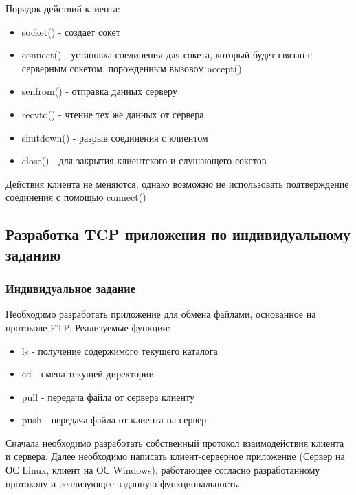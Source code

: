 Порядок действий клиента:
\begin{itemize}
\item socket() - создает сокет
\item connect() - установка соединения для сокета, который будет связан с серверным сокетом, порожденным вызовом accept()
\item senfrom() - отправка данных серверу
\item recvto() - чтение тех же данных от сервера
\item shutdown() - разрыв соединения с клиентом
\item close() - для закрытия клиентского и слушающего сокетов
\end{itemize}
Действия клиента не меняются, однако возможно не использовать подтверждение соединения с помощью connect()

\subsection{Разработка TCP приложения по индивидуальному заданию}
\subsubsection{Индивидуальное задание}
Необходимо разработать приложение для обмена файлами, основанное на протоколе FTP. Реализуемые функции:
\begin{itemize}
\item ls - получение содержимого текущего каталога
\item cd - смена текущей директории
\item pull - передача файла от сервера клиенту
\item push - передача файла от клиента на сервер
\end{itemize}

Сначала необходимо разработать собственный протокол взаимодействия клиента и сервера. Далее необходимо написать клиент-серверное приложение (Сервер на ОС Linux, клиент на ОС Windows), работающее согласно разработанному протоколу и реализующее заданную функциональность.
